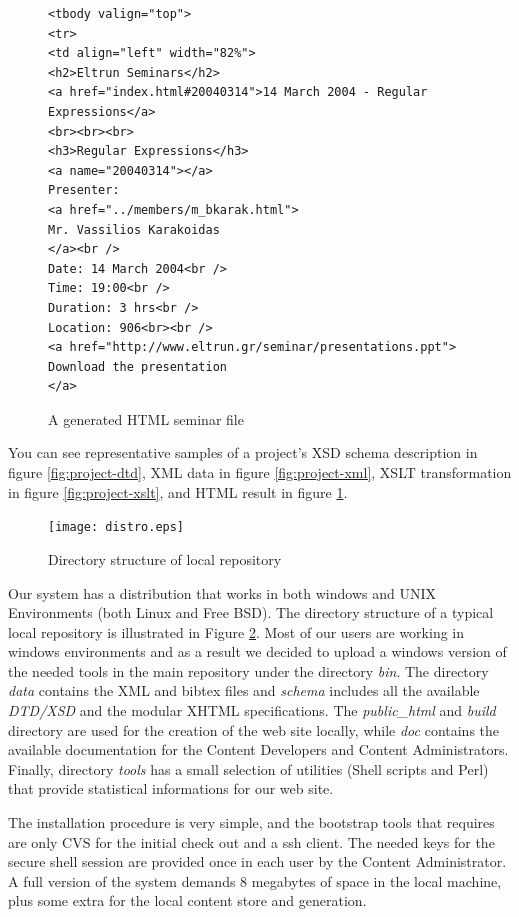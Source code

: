 \documentclass[10pt]{article}
\begin{document}
\begin{figure}
\lstset{language=MYLANG,basicstyle=\ttfamily}
{\begin{lstlisting}
<tbody valign="top">
<tr>
<td align="left" width="82%">
<h2>Eltrun Seminars</h2>
<a href="index.html#20040314">14 March 2004 - Regular Expressions</a>
<br><br><br>
<h3>Regular Expressions</h3>
<a name="20040314"></a>
Presenter: 
<a href="../members/m_bkarak.html">
Mr. Vassilios Karakoidas
</a><br />
Date: 14 March 2004<br />
Time: 19:00<br />
Duration: 3 hrs<br />
Location: 906<br><br />
<a href="http://www.eltrun.gr/seminar/presentations.ppt">
Download the presentation
</a>
\end{lstlisting}}
\caption{A generated HTML seminar file}
\label{fig:project-html}
\end{figure}

You can see representative samples of a project's
{\sc XSD} schema description in figure \ref{fig:project-dtd},
{\sc XML} data in figure \ref{fig:project-xml},
XSLT transformation in figure \ref{fig:project-xslt},
and {\sc HTML} result in figure \ref{fig:project-html}.

\begin{figure}
\texttt{[image: distro.eps]}
\caption{Directory structure of local repository}
\label{fig:eltrun-web-distro}
\end{figure}

Our system has a distribution that works in both {\sc windows} and 
{\sc UNIX} Environments (both Linux and Free BSD). The directory structure of a typical 
local repository is illustrated in Figure \ref{fig:eltrun-web-distro}.
Most of our users are working in {\sc windows} environments and as 
a result we decided to upload a {\sc windows} version of the needed tools 
in the main repository under the directory \textit{bin}.
The directory \textit{data} contains the {\sc XML} and {\sc bibtex} files and \textit{schema}
includes all the available \textit{DTD/XSD} and the modular {\sc XHTML} specifications.
The \textit{public\_html} and \textit{build} directory are used for the creation of the 
web site locally, while \textit{doc} contains the available documentation for the Content Developers
and Content Administrators. Finally, directory \textit{tools} has a small selection 
of utilities (Shell scripts and {\sc Perl}) that provide statistical informations
for our web site.

The installation procedure is very simple,
and the bootstrap tools that requires are only {\sc CVS} for 
the initial check out and a ssh client. The needed keys 
for the secure shell session are provided once in each user by the Content Administrator. 
A full version of the system demands 8 megabytes of space 
in the local machine, plus some extra for the local content store and generation.
\end{document}
